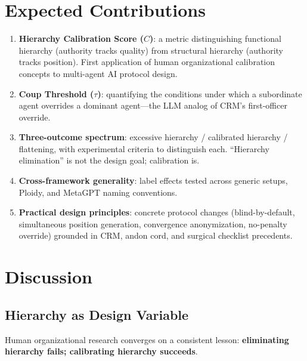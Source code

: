 \documentclass[11pt]{article}
\theoremstyle{definition}
\begin{document}
\section{Expected Contributions}

\begin{enumerate}[nosep]
    \item \textbf{Hierarchy Calibration Score ($C$)}: a metric distinguishing functional hierarchy (authority tracks quality) from structural hierarchy (authority tracks position). First application of human organizational calibration concepts to multi-agent AI protocol design.
    \item \textbf{Coup Threshold ($\tau$)}: quantifying the conditions under which a subordinate agent overrides a dominant agent---the LLM analog of CRM's first-officer override.
    \item \textbf{Three-outcome spectrum}: excessive hierarchy / calibrated hierarchy / flattening, with experimental criteria to distinguish each. ``Hierarchy elimination'' is not the design goal; calibration is.
    \item \textbf{Cross-framework generality}: label effects tested across generic setups, Ploidy, and MetaGPT naming conventions.
    \item \textbf{Practical design principles}: concrete protocol changes (blind-by-default, simultaneous position generation, convergence anonymization, no-penalty override) grounded in CRM, andon cord, and surgical checklist precedents.
\end{enumerate}

\section{Discussion}
\label{sec:discussion}

\subsection{Hierarchy as Design Variable}

Human organizational research converges on a consistent lesson: \textbf{eliminating hierarchy fails; calibrating hierarchy succeeds}.
\end{document}
